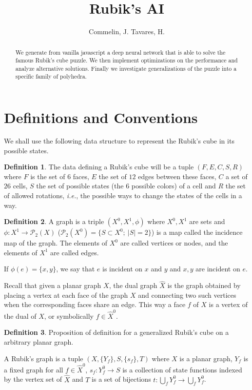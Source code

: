 \documentclass[]{article}
\title{Rubik's AI}
\author{Commelin, J. Tavares, H.}
\theoremstyle{definition}
\newtheorem{definition}{Definition}[section]
\theoremstyle{definition}
\newcommand{\raw}{\rightarrow}
\newcommand{\ie}{\textit{i.e.}}
\begin{document}
\maketitle

\begin{abstract}
We generate from vanilla javascript a deep neural network that is able to solve the famous Rubik's cube puzzle. We then implement optimizations on the performance and analyze alternative solutions. Finally we investigate generalizations of the puzzle into a specific family of polyhedra.
\end{abstract}

\section{Definitions and Conventions}

We shall use the following data structure to represent the Rubik's cube in its possible states. 

\begin{definition}
	The data defining a Rubik's cube will be a tuple $(F, E, C, S, R)$ where $F$ is the set of $6$ faces, $E$ the set of $12$ edges between these faces, $C$ a set of $26$ cells, $S$ the set of possible states (the $6$ possible colors) of a cell and $R$ the set of allowed rotations, \ie, the possible ways to change the states of the cells in a  way. 
\end{definition}

\begin{definition}
	A graph is a triple $(X^0, X^1, \phi)$ where $X^0, X^1$ are sets and $\phi: X^1 \raw \mathcal{P}_2(X)$ ($\mathcal{P}_2(X^0) = \{S \subset X^0; \ |S| = 2 \}$) is a map called the incidence map of the graph. The elements of $X^0$ are called vertices or nodes, and the elements of $X^1$ are called edges.	
	
	If $\phi(e) = \{x, y\}$, we say that $e$ is incident on $x$ and $y$ and $x, y$ are incident on $e$.
\end{definition}

Recall that given a planar graph $X$, the dual graph $\hat{X}$ is the graph obtained by placing a vertex at each face of the graph $X$ and connecting two such vertices when the corresponding faces share an edge. This way a face $f$ of $X$ is a vertex of the dual of $X$, or symbolically $f \in \hat{X}^0$.

\begin{definition}
	Proposition of definition for a generalized Rubik's cube on a arbitrary planar graph.
	
	A Rubik's graph is a tuple $(X, \{Y_f\}, S, \{s_f\}, T)$ where $X$ is a planar graph, $Y_f$ is a fixed graph for all $f \in \hat{X}^0$, $s_f: Y_f^0 \raw S$ is a collection of state functions indexed by the vertex set of $\hat{X}$ and $T$ is a set of bijections $t:\bigcup_f Y^0_f \raw \bigcup_f Y^0_f$.
	
\end{definition}
\end{document}
